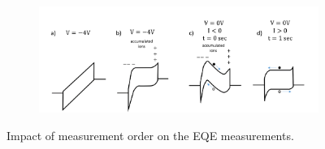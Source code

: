 \begin{figure}[htbp]
    
    \begin{subfigure}[t]{0.9\textwidth}
        \centering
        \includegraphics[width=\textwidth]{chapters/material_properties/images/ions.png} %
        \caption{}
        \label{fig:ch2:eqe_drop_mechanism}
    \end{subfigure}

    \caption{Impact of measurement order on the EQE measurements.}
    \label{fig:ch2:eqe}
\end{figure}


